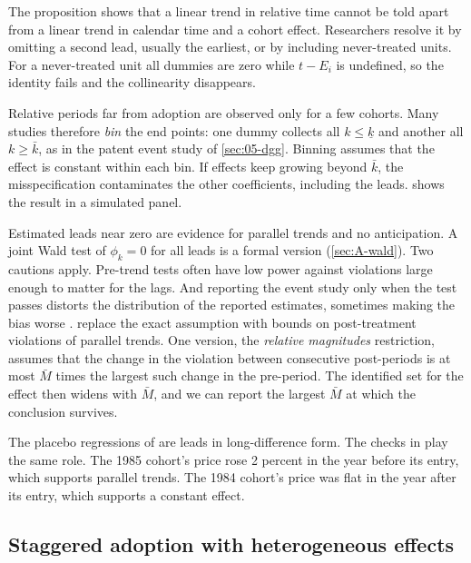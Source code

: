 The proposition shows that a linear trend in relative time cannot be told apart from a linear trend in calendar time
and a cohort effect. Researchers resolve it by omitting a second lead, usually the earliest, or by including
never-treated units. For a never-treated unit all dummies are zero while $t-E_i$ is undefined, so the identity
fails and the collinearity disappears.

Relative periods far from adoption are observed only for a few cohorts. Many studies therefore \emph{bin} the end
points: one dummy collects all $k\le\underline k$ and another all $k\ge\bar k$, as in the patent event study of
\cref{sec:05-dgg}. Binning assumes that the effect is constant within each bin. If effects keep growing beyond
$\bar k$, the misspecification contaminates the other coefficients, including the leads. 
shows the result in a simulated panel.

Estimated leads near zero are evidence for parallel trends and no anticipation. A joint Wald test of $\phi_k=0$ for
all leads is a formal version (\cref{sec:A-wald}). Two cautions apply. Pre-trend tests often have low power against
violations large enough to matter for the lags. And reporting the event study only when the test passes distorts the
distribution of the reported estimates, sometimes making the bias worse \citep{Roth2022}. \citet{RambachanRoth2023}
replace the exact assumption with bounds on post-treatment violations of parallel trends. One version, the
\emph{relative magnitudes} restriction, assumes that the change in the violation between consecutive post-periods is
at most $\bar M$ times the largest such change in the pre-period. The identified set for the effect then widens with
$\bar M$, and we can report the largest $\bar M$ at which the conclusion survives.

The placebo regressions of \citet{Dafny2009} are leads in long-difference form. The checks in
\citet{WhinstonCollins1992} play the same role. The 1985 cohort's price rose 2 percent in the year before its entry,
which supports parallel trends. The 1984 cohort's price was flat in the year after its entry, which supports a
constant effect.

\subsection{Staggered adoption with heterogeneous effects}\label{sec:A-did-staggered}

